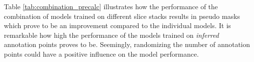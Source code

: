 

Table \ref{tab:combination_precalc} illustrates how the performance of the combination of models trained on different slice stacks results in pseudo masks which prove to be an improvement compared to the individual models.
It is remarkable how high the performance of the models trained on \textit{inferred} annotation points proves to be.
Seemingly, randomizing the number of annotation points could have a positive influence on the model performance.

